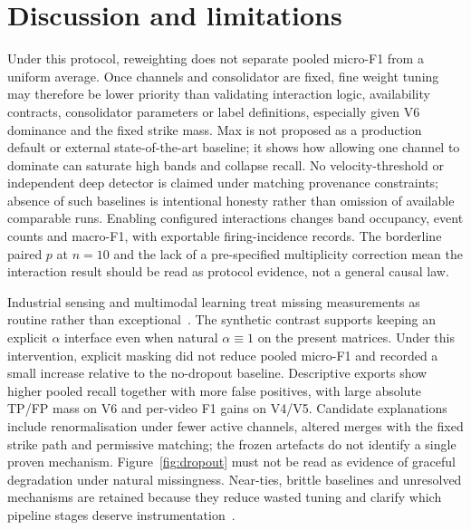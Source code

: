 \documentclass[preprint,12pt,numbers,sort&compress]{elsarticle}
\begin{document}
\section{Discussion and limitations}
\label{sec:discussion}
\label{sec:disc-dropout}
\label{sec:limitations}

Under this protocol, reweighting does not separate pooled micro-F1 from a uniform average.
Once channels and consolidator are fixed, fine weight tuning may therefore be lower priority than validating interaction logic, availability contracts, consolidator parameters or label definitions, especially given V6 dominance and the fixed strike mass.
Max is not proposed as a production default or external state-of-the-art baseline; it shows how allowing one channel to dominate can saturate high bands and collapse recall.
No velocity-threshold or independent deep detector is claimed under matching provenance constraints; absence of such baselines is intentional honesty rather than omission of available comparable runs.
Enabling configured interactions changes band occupancy, event counts and macro-F1, with exportable firing-incidence records.
The borderline paired $p$ at $n{=}10$ and the lack of a pre-specified multiplicity correction mean the interaction result should be read as protocol evidence, not a general causal law.

Industrial sensing and multimodal learning treat missing measurements as routine rather than exceptional~\cite{emmanuel2021missing,teh2020sensorquality,ma2021smil}.
The synthetic contrast supports keeping an explicit $\alpha$ interface even when natural $\alpha{\equiv}1$ on the present matrices.
Under this intervention, explicit masking did not reduce pooled micro-F1 and recorded a small increase relative to the no-dropout baseline.
Descriptive exports show higher pooled recall together with more false positives, with large absolute TP/FP mass on V6 and per-video F1 gains on V4/V5.
Candidate explanations include renormalisation under fewer active channels, altered merges with the fixed strike path and permissive matching; the frozen artefacts do not identify a single proven mechanism.
Figure~\ref{fig:dropout} must not be read as evidence of graceful degradation under natural missingness.
Near-ties, brittle baselines and unresolved mechanisms are retained because they reduce wasted tuning and clarify which pipeline stages deserve instrumentation~\cite{lipton2018mythos,pineau2021reproducibility,kapoor2023leakage}.
\end{document}
